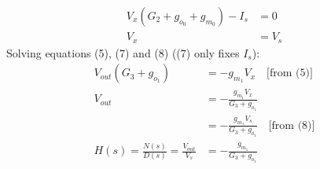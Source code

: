 \begin{enumerate}
\begin{align*}
      V_{x}(G_2 + g_{o_0} + g_{m_0}) - I_{s} &=0 \tag{7} \\
      V_{x} &= V_{s} \tag{8}
    \end{align*}
    Solving equations (5), (7) and (8) ((7) only fixes \(I_s\)):
    \begin{align*}
      V_{out}(G_3 + g_{o_1}) &= - g_{m_1} V_{x} \quad \text{[from (5)]} \\
      V_{out} &= - \frac{g_{m_1} V_{x}}{G_3 + g_{o_1}} \\
              &= - \frac{g_{m_1} V_{s}}{G_3 + g_{o_1}} \quad \text{[from (8)]} \\
      H(s) = \frac{N(s)}{D(s)} = \frac{V_{out}}{V_{s}} &= - \frac{g_{m_1}}{G_3 + g_{o_1}}
    \end{align*}
\end{enumerate}

